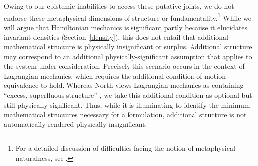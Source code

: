 \documentclass[12pt, english, twoside]{article} %
\begin{document}
Owing to our epistemic inabilities to access these putative joints, we do not endorse these metaphysical dimensions of structure or fundamentality.\footnote{For a detailed discussion of difficulties facing the notion of metaphysical naturalness, see \textcites[]{Dorr_Hawthorne}.} While we will argue that Hamiltonian mechanics is significant partly because it elucidates invariant densities (Section~\ref{density}), this does not entail that additional mathematical structure is physically insignificant or surplus. Additional structure may correspond to an additional physically-significant assumption that applies to the system under consideration. Precisely this scenario occurs in the context of Lagrangian mechanics, which requires the additional condition of motion equivalence to hold. Whereas North views Lagrangian mechanics as containing ``excess, superfluous structure'' \parencites*[75]{North}, we take this additional condition as optional but still physically significant. Thus, while it is illuminating to identify the minimum mathematical structures necessary for a formulation, additional structure is not automatically rendered physically insignificant. 
\end{document}
